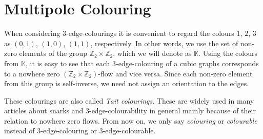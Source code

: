 \section{Multipole Colouring}\label{sec:multipole-colouring}


When considering $3$-edge-colourings it is convenient to regard the colours $1$, $2$, $3$ as $(0, 1)$, $(1, 0)$, $(1,1)$, respectively. In other words, we use the set of non-zero elements of the group $\mathbb{Z}_2\times\mathbb{Z}_2$, which we will denote as $\mathbb{K}$. Using the colours from $\mathbb{K}$, it is easy to see that each $3$-edge-colouring of a cubic graphs corresponds to a nowhere zero $(\mathbb{Z}_2\times\mathbb{Z}_2)$-flow and vice versa. Since each non-zero element from this group is self-inverse, we need not assign an orientation to the edges.

	

These colourings are also called \textit{Tait colourings}. These are widely used in many articles about snarks and 3-edge-colourability in general  mainly because of their relation to nowhere zero flows.
From now on, we only say \textit{colouring} or \textit{colourable} instead of $3$-edge-colouring or $3$-edge-colourable.

